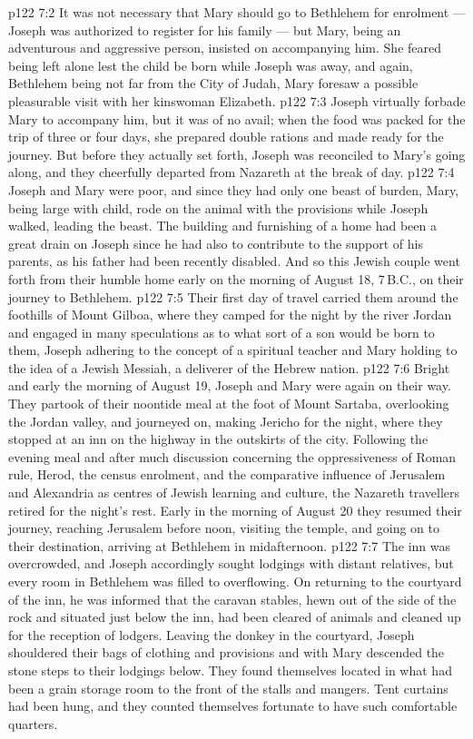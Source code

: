 \vs p122 7:2 It was not necessary that Mary should go to Bethlehem for enrolment --- Joseph was authorized to register for his family --- but Mary, being an adventurous and aggressive person, insisted on accompanying him. She feared being left alone lest the child be born while Joseph was away, and again, Bethlehem being not far from the City of Judah, Mary foresaw a possible pleasurable visit with her kinswoman Elizabeth.
\vs p122 7:3 Joseph virtually forbade Mary to accompany him, but it was of no avail; when the food was packed for the trip of three or four days, she prepared double rations and made ready for the journey. But before they actually set forth, Joseph was reconciled to Mary’s going along, and they cheerfully departed from Nazareth at the break of day.
\vs p122 7:4 Joseph and Mary were poor, and since they had only one beast of burden, Mary, being large with child, rode on the animal with the provisions while Joseph walked, leading the beast. The building and furnishing of a home had been a great drain on Joseph since he had also to contribute to the support of his parents, as his father had been recently disabled. And so this Jewish couple went forth from their humble home early on the morning of August 18, 7\,B.C., on their journey to Bethlehem.
\vs p122 7:5 Their first day of travel carried them around the foothills of Mount Gilboa, where they camped for the night by the river Jordan and engaged in many speculations as to what sort of a son would be born to them, Joseph adhering to the concept of a spiritual teacher and Mary holding to the idea of a Jewish Messiah, a deliverer of the Hebrew nation.
\vs p122 7:6 Bright and early the morning of August 19, Joseph and Mary were again on their way. They partook of their noontide meal at the foot of Mount Sartaba, overlooking the Jordan valley, and journeyed on, making Jericho for the night, where they stopped at an inn on the highway in the outskirts of the city. Following the evening meal and after much discussion concerning the oppressiveness of Roman rule, Herod, the census enrolment, and the comparative influence of Jerusalem and Alexandria as centres of Jewish learning and culture, the Nazareth travellers retired for the night’s rest. Early in the morning of August 20 they resumed their journey, reaching Jerusalem before noon, visiting the temple, and going on to their destination, arriving at Bethlehem in midafternoon.
\vs p122 7:7 The inn was overcrowded, and Joseph accordingly sought lodgings with distant relatives, but every room in Bethlehem was filled to overflowing. On returning to the courtyard of the inn, he was informed that the caravan stables, hewn out of the side of the rock and situated just below the inn, had been cleared of animals and cleaned up for the reception of lodgers. Leaving the donkey in the courtyard, Joseph shouldered their bags of clothing and provisions and with Mary descended the stone steps to their lodgings below. They found themselves located in what had been a grain storage room to the front of the stalls and mangers. Tent curtains had been hung, and they counted themselves fortunate to have such comfortable quarters.
